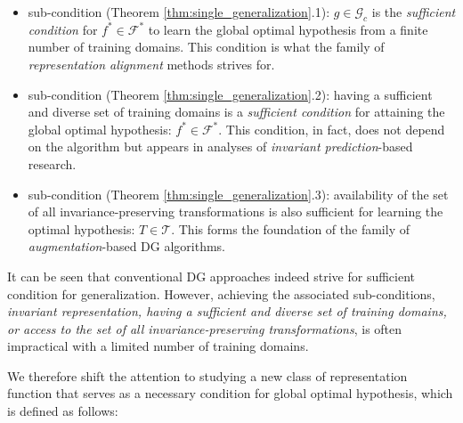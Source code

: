 \begin{itemize}
    \item sub-condition (Theorem \ref{thm:single_generalization}.1): $g \in \mathcal{G}_c$ 
    is the \textit{sufficient condition} for 
    $f^* \in \mathcal{F}^*$ 
    to learn the global optimal hypothesis from a finite number of training domains. This condition is what the family of \textit{representation alignment} methods strives for.

     \item sub-condition (Theorem \ref{thm:single_generalization}.2): having a sufficient and diverse set of training domains is a \textit{sufficient condition} for attaining the global optimal hypothesis:
    $f^* \in \mathcal{F}^*$.
    This condition, in fact, does not depend on the algorithm but appears in analyses of \textit{invariant prediction}-based research.

     \item sub-condition (Theorem \ref{thm:single_generalization}.3): availability of the set of all invariance-preserving transformations is also sufficient for learning the optimal hypothesis:
    $T \in \mathcal{T}$.
    This forms the foundation of the family of \textit{augmentation}-based DG algorithms.
\end{itemize}

It can be seen that conventional DG approaches indeed strive for sufficient condition for generalization. However, achieving the associated sub-conditions, \textit{invariant representation, having a sufficient and diverse set of training domains, or access to the set of all invariance-preserving transformations}, is often impractical with a limited number of training domains. %





We therefore shift the attention to studying a new class of
representation function that serves as a necessary condition for global optimal hypothesis, which is
defined as follows:

